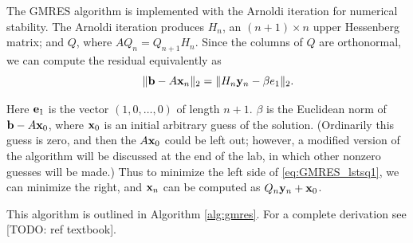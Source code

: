 The GMRES algorithm is implemented with the Arnoldi iteration for numerical stability.  The Arnoldi iteration produces $H_n$, an $(n+1)\times n$ upper Hessenberg matrix; and $Q$, where $AQ_n = Q_{n+1}H_n$.  Since the columns of $Q$ are orthonormal, we can compute the residual equivalently as
\begin{equation}
\qquad \|{\bf b} - A{\bf x}_n\|_2 = \|H_n {\bf y}_n - \beta e_1\|_2.
\label{eq:GMRES_lstsq1}
\end{equation}

Here ${\bf e}_1$ is the vector $(1, 0, \ldots, 0)$ of length $n+1$.  $\beta$ is the Euclidean norm of ${\bf b} - A{\bf x}_0$, where ${\bf x}_0$ is an initial arbitrary guess of the solution.  (Ordinarily this guess is zero, and then the $A{\bf x}_0$ could be left out; however, a modified version of the algorithm will be discussed at the end of the lab, in which other nonzero guesses will be made.)  Thus to minimize the left side of \ref{eq:GMRES_lstsq1}, we can minimize the right, and ${\bf x}_n $ can be computed as $ Q_n {\bf y}_n + {\bf x}_0$.

This algorithm is outlined in Algorithm \ref{alg:gmres}.
For a complete derivation see [TODO: ref textbook].


